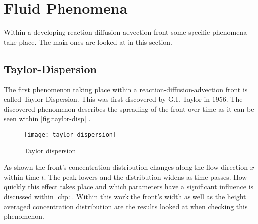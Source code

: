 \documentclass[../thesis.tex]{subfiles}
\begin{document}
\section{Fluid Phenomena}

Within a developing reaction-diffusion-advection front some specific phenomena take place. The main ones are looked at in this section.

\subsection{Taylor-Dispersion}

The first phenomenon taking place within a reaction-diffusion-advection front is called Taylor-Dispersion. This was first discovered by G.I. Taylor\cite{aris1956dispersion} in 1956. The discovered phenomenon describes the spreading of the front over time as it can be seen within \autoref{fig:taylor-disp} \cite{levenspiel1998chemical}. 

\begin{figure}[htbp]
	\centering
	\texttt{[image: taylor-dispersion]}
	\caption{Taylor dispersion}
	\label{fig:taylor-disp}
\end{figure}

As shown the front's concentration distribution changes along the flow direction $x$ within time $t$. The peak lowers and the distribution widens as time passes. How quickly this effect takes place and which parameters have a significant influence is discussed within \autoref{chp:}. Within this work the front's width as well as the height averaged concentration distribution are the results looked at when checking this phenomenon.
\end{document}
